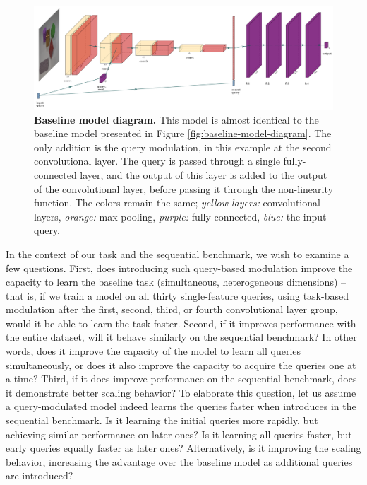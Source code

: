 \begin{figure}[!htb]
\centering
\includegraphics[width=\linewidth]{ch-models-compared/figures/modulated.pdf}
\caption[Baseline model diagram.]{{\bf Baseline model diagram.} This model is almost identical to the baseline model presented in Figure \ref{fig:baseline-model-diagram}. The only addition is the query modulation, in this example at the second convolutional layer. The query is passed through a single fully-connected layer, and the output of this layer is added to the output of the convolutional layer, before passing it through the non-linearity function. The colors remain the same; \emph{yellow layers:} convolutional layers, \emph{orange:} max-pooling, \emph{purple:} fully-connected, \emph{blue:} the input query.}
\label{fig:query-mod-model-diagram}
\end{figure}

In the context of our task and the sequential benchmark, we wish to examine a few questions. First, does introducing such query-based modulation improve the capacity to learn the baseline task (simultaneous, heterogeneous dimensions) -- that is, if we train a model on all thirty single-feature queries, using task-based modulation after the first, second, third, or fourth convolutional layer group, would it be able to learn the task faster. Second, if it improves performance with the entire dataset, will it behave similarly on the sequential benchmark? In other words, does it improve the capacity of the model to learn all queries simultaneously, or does it also improve the capacity to acquire the queries one at a time? Third, if it does improve performance on the sequential benchmark, does it demonstrate better scaling behavior? To elaborate this question, let us assume a query-modulated model indeed learns the queries faster when introduces in the sequential benchmark. Is it learning the initial queries more rapidly, but achieving similar performance on later ones? Is it learning all queries faster, but early queries equally faster as later ones? Alternatively, is it improving the scaling behavior, increasing the advantage over the baseline model as additional queries are introduced?